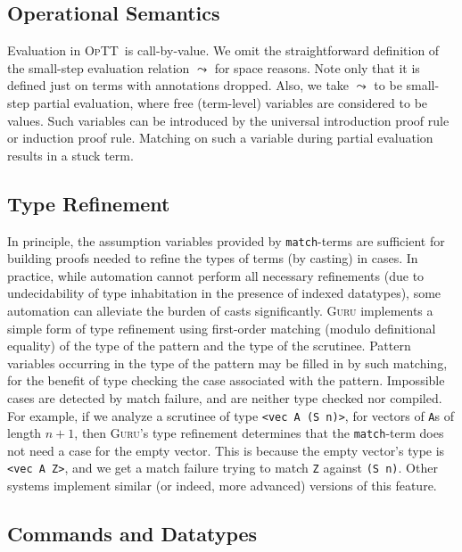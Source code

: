 \documentclass[9pt,natbib]{sigplanconf}
\newcommand{\optt}{\textsc{OpTT}}
\begin{document}
\subsection{Operational Semantics}
\label{sec:opsem}

Evaluation in \optt\ is call-by-value.  We omit the straightforward
definition of the small-step evaluation relation $\leadsto$ for space
reasons.  Note only that it is defined just on terms with annotations
dropped.  Also, we take $\leadsto$ to be small-step partial
evaluation, where free (term-level) variables are considered to be
values.  Such variables can be introduced by the universal
introduction proof rule or induction proof rule.  Matching on such a
variable during partial evaluation results in a stuck term.

\subsection{Type Refinement}

In principle, the assumption variables provided by
\texttt{match}-terms are sufficient for building proofs needed to
refine the types of terms (by casting) in cases.  In practice, while
automation cannot perform all necessary refinements (due to
undecidability of type inhabitation in the presence of indexed
datatypes), some automation can alleviate the burden of casts
significantly.  \textsc{Guru} implements a simple form of type
refinement using first-order matching (modulo definitional equality)
of the type of the pattern and the type of the scrutinee.  Pattern
variables occurring in the type of the pattern may be filled in by
such matching, for the benefit of type checking the case associated
with the pattern.  Impossible cases are detected by match failure, and
are neither type checked nor compiled.  For example, if we analyze a
scrutinee of type \texttt{<vec A (S n)>}, for vectors of \texttt{A}s
of length $n+1$, then \textsc{Guru}'s type refinement determines that
the \texttt{match}-term does not need a case for the empty vector.
This is because the empty vector's type is \texttt{<vec A Z>}, and we
get a match failure trying to match \texttt{Z} against \texttt{(S n)}.
Other systems implement similar (or indeed, more advanced) versions of
this feature.


\subsection{Commands and Datatypes}
\label{sec:commands}
\end{document}
